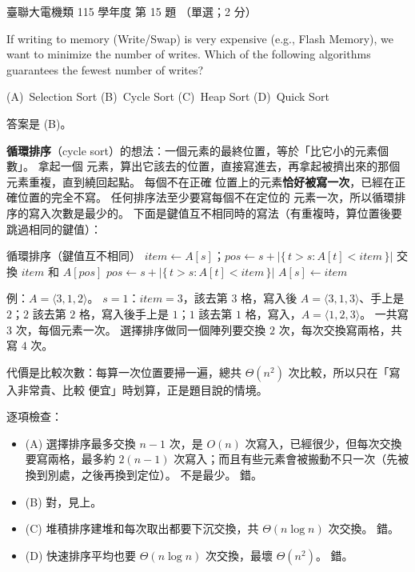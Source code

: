 \begin{pastexam}[label={px:ust-115-ee-ds-15}]{臺聯大電機類 115 學年度 第 15 題}
（單選；2 分）

If writing to memory (Write/Swap) is very expensive (e.g., Flash Memory), we want to minimize the
number of writes. Which of the following algorithms guarantees the fewest number of writes?

(A)~Selection Sort \qquad (B)~Cycle Sort \qquad (C)~Heap Sort \qquad (D)~Quick Sort
\end{pastexam}

\begin{pastsoln}
答案是 (B)。

\textbf{循環排序}（cycle sort）的想法：一個元素的最終位置，等於「比它小的元素個數」。 拿起一個
元素，算出它該去的位置，直接寫進去，再拿起被擠出來的那個元素重複，直到繞回起點。 每個不在正確
位置上的元素\textbf{恰好被寫一次}，已經在正確位置的完全不寫。 任何排序法至少要寫每個不在定位的
元素一次，所以循環排序的寫入次數是最少的。 下面是鍵值互不相同時的寫法（有重複時，算位置後要
跳過相同的鍵值）：
\begin{pseudo}{循環排序（鍵值互不相同）}
        \State $\mathit{item} \gets A[s]$；$\mathit{pos} \gets s + |\{\, t > s : A[t] < \mathit{item} \,\}|$
         
                \State 交換 $\mathit{item}$ 和 $A[\mathit{pos}]$ 
                \State $\mathit{pos} \gets s + |\{\, t > s : A[t] < \mathit{item} \,\}|$
            \EndWhile
            \State $A[s] \gets \mathit{item}$ 
        \EndIf
    \EndFor
\EndProcedure
\end{pseudo}
例：$A = \langle 3, 1, 2\rangle$。 $s = 1$：$\mathit{item} = 3$，該去第 $3$ 格，寫入後
$A = \langle 3, 1, 3\rangle$、手上是 $2$；$2$ 該去第 $2$ 格，寫入後手上是 $1$；$1$ 該去第 $1$
格，寫入，$A = \langle 1, 2, 3\rangle$。 一共寫 $3$ 次，每個元素一次。 選擇排序做同一個陣列要交換
$2$ 次，每次交換寫兩格，共寫 $4$ 次。

代價是比較次數：每算一次位置要掃一遍，總共 $\Theta(n^2)$ 次比較，所以只在「寫入非常貴、比較
便宜」時划算，正是題目說的情境。

逐項檢查：
\begin{itemize}
\item (A) 選擇排序最多交換 $n - 1$ 次，是 $O(n)$ 次寫入，已經很少，但每次交換要寫兩格，最多約
$2(n - 1)$ 次寫入；而且有些元素會被搬動不只一次（先被換到別處，之後再換到定位）。 不是最少。 錯。
\item (B) 對，見上。
\item (C) 堆積排序建堆和每次取出都要下沉交換，共 $\Theta(n \log n)$ 次交換。 錯。
\item (D) 快速排序平均也要 $\Theta(n \log n)$ 次交換，最壞 $\Theta(n^2)$。 錯。
\end{itemize}
\end{pastsoln}
